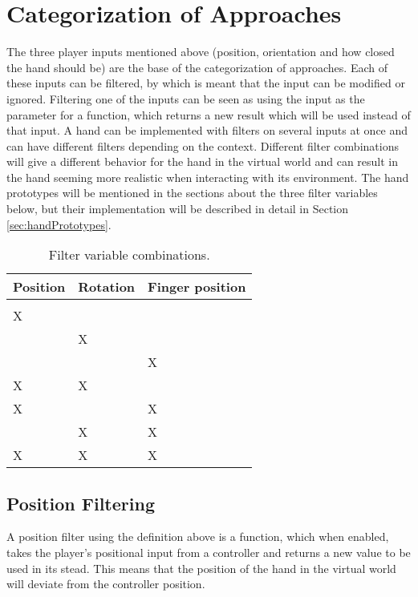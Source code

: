 \section{Categorization of Approaches}
\label{sec:categorizationOfApproaches}
The three player inputs mentioned above (position, orientation and how closed the hand should be) are the base of the categorization of approaches. Each of these inputs can be filtered, by which is meant that the input can be modified or ignored. Filtering one of the inputs can be seen as using the input as the parameter for a function, which returns a new result which will be used instead of that input. A hand can be implemented with filters on several inputs at once and can have different filters depending on the context. Different filter combinations will give a different behavior for the hand in the virtual world and can result in the hand seeming more realistic when interacting with its environment. The hand prototypes will be mentioned in the sections about the three filter variables below, but their implementation will be described in detail in Section \ref{sec:handPrototypes}.

\begin{table}[H]
\centering
\caption{Filter variable combinations.}
\label{tab:filterVariableCombinations}
\begin{tabular}{C{2cm}C{2cm}C{2cm}}
Position & Rotation & Finger position \\ \midrule \midrule
				&					&					\\ \midrule
\Large X	&					&					\\ \midrule
				& \Large X	& 		                \\ \midrule
				&					& \Large X     \\ \midrule
\Large X	& \Large X	&					\\ \midrule
\Large X 	&					& \Large X	\\ \midrule
				& \Large X	& \Large X	\\ \midrule
\Large X 	& \Large X 	& \Large X
\end{tabular}
\end{table}

\subsection{Position Filtering}
\label{subsec:categoryPositionFiltering}
A position filter using the definition above is a function, which when enabled, takes the player's positional input from a controller and returns a new value to be used in its stead. This means that the position of the hand in the virtual world will deviate from the controller position.\\

